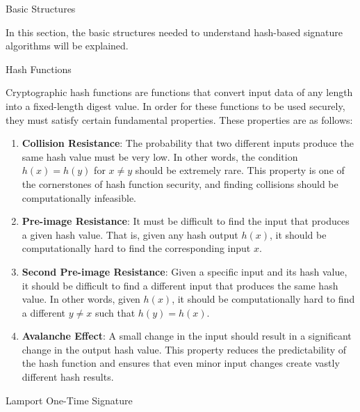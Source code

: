 \begin{section}{Basic Structures}

 In this section, the basic structures needed to understand hash-based
 signature algorithms will be explained.


 \begin{subsection}{Hash Functions}

	 Cryptographic hash functions are functions that convert input data
	 of any length into a fixed-length digest value. In order for these
	 functions to be used securely, they must satisfy certain fundamental
	 properties. These properties are as follows:

	 \begin{enumerate}[label=\textbf{\arabic*.}]
		 \item \textbf{Collision Resistance}: The probability that two
		       different inputs produce the same hash value must be very low.
		       In other words, the condition \( h(x) = h(y) \) for \( x \neq y \)
		       should be extremely rare. This property is one of the cornerstones
		       of hash function security, and finding collisions should be
		       computationally infeasible.

		 \item \textbf{Pre-image Resistance}: It must be difficult to find the input
		       that produces a given hash value. That is, given any hash output \( h(x) \),
		       it should be computationally hard to find the corresponding input \( x \).

		 \item \textbf{Second Pre-image Resistance}: Given a specific input and its
		       hash value, it should be difficult to find a different input that produces
		       the same hash value. In other words, given \( h(x) \), it should be computationally hard to find a different \( y \neq x \) such that \( h(y) = h(x) \).

		 \item \textbf{Avalanche Effect}: A small change in the input should result in a significant change in the output hash value. This property reduces the predictability of the hash function and ensures that even minor input changes create vastly different hash results.
	 \end{enumerate}

 \end{subsection}

 \begin{subsection}{Lamport One-Time Signature}


\end{subsection}
\end{section}
